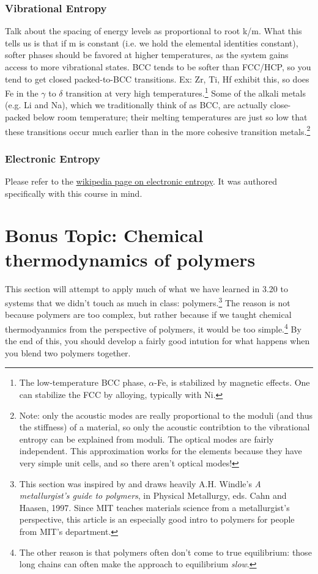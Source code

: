 \documentclass[12pt]{article}
\begin{document}
\subsubsection{Vibrational Entropy}
Talk about the spacing of energy levels as proportional to root k/m.
What this tells us is that if m is constant (i.e. we hold the elemental identities constant), softer phases should be favored at higher temperatures, as the system gains access to more vibrational states.
BCC tends to be softer than FCC/HCP, so you tend to get closed packed-to-BCC transitions. Ex: Zr, Ti, Hf exhibit this, so does Fe in the $\gamma$ to $\delta$ transition at very high temperatures.\footnote{The low-temperature BCC phase, $\alpha$-Fe, is stabilized by magnetic effects. One can stabilize the FCC by alloying, typically with Ni.} Some of the alkali metals (e.g. Li and Na), which we traditionally think of as BCC, are actually close-packed below room temperature; their melting temperatures are just so low that these transitions occur much earlier than in the more cohesive transition metals.\footnote{Note: only the acoustic modes are really proportional to the moduli (and thus the stiffness) of a material, so only the acoustic contribtion to the vibrational entropy can be explained from moduli. The optical modes are fairly independent. This approximation works for the elements because they have very simple unit cells, and so there aren't optical modes!}

\subsubsection{Electronic Entropy}
Please refer to the \href{https://en.wikipedia.org/wiki/Electronic_entropy}{wikipedia page on electronic entropy}. It was authored specifically with this course in mind.


\section{Bonus Topic: Chemical thermodynamics of polymers}
This section will attempt to apply much of what we have learned in 3.20 to systems that we didn't touch as much in class: polymers.\footnote{This section was inspired by and draws heavily A.H. Windle's \textit{A metallurgist's guide to polymers}, in Physical Metallurgy, eds. Cahn and Haasen, 1997. Since MIT teaches materials science from a metallurgist's perspective, this article is an especially good intro to polymers for people from MIT's department.} The reason is not because polymers are too complex, but rather because if we taught chemical thermodyanmics from the perspective of polymers, it would be too simple.\footnote{The other reason is that polymers often don't come to true equilibrium: those long chains can often make the approach to equilibrium \emph{slow}.} By the end of this, you should develop a fairly good intution for what happens when you blend two polymers together. 
\end{document}
